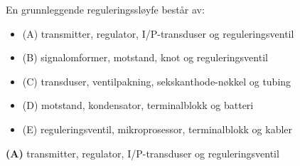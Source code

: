 

En grunnleggende reguleringssløyfe består av:

\begin{itemize}
\item{(A)} transmitter, regulator, I/P-transduser og reguleringsventil
\vskip 5pt 
\item{(B)} signalomformer, motstand, knot og reguleringsventil
\vskip 5pt 
\item{(C)} transduser, ventilpakning, sekskanthode-nøkkel og tubing
\vskip 5pt 
\item{(D)} motstand, kondensator, terminalblokk og batteri
\vskip 5pt 
\item{(E)} reguleringsventil, mikroprosessor, terminalblokk og kabler
\end{itemize}







{\bf (A)} transmitter, regulator, I/P-transduser og reguleringsventil
 








